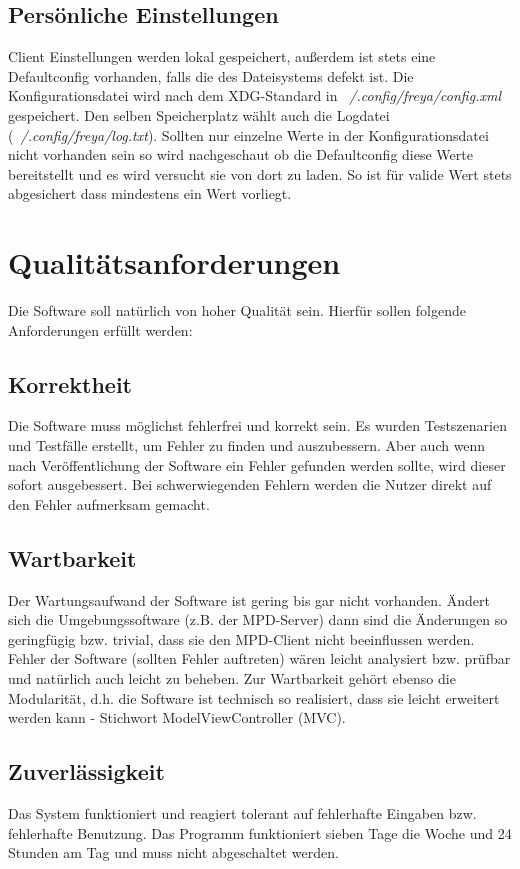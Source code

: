 \subsection{Persönliche Einstellungen}
Client Einstellungen werden lokal gespeichert, außerdem ist stets eine Defaultconfig vorhanden, falls die des Dateisystems defekt ist.
Die Konfigurationsdatei wird nach dem XDG-Standard in \emph{~/.config/freya/config.xml} gespeichert. Den selben Speicherplatz wählt auch die Logdatei 
(\emph{~/.config/freya/log.txt}). Sollten nur einzelne Werte in der Konfigurationsdatei nicht vorhanden sein so wird nachgeschaut ob die Defaultconfig
diese Werte bereitstellt und es wird versucht sie von dort zu laden. So ist für valide Wert stets abgesichert dass mindestens ein Wert vorliegt.
\section{Qualitätsanforderungen}
Die Software soll natürlich von hoher Qualität sein. Hierfür sollen folgende
Anforderungen erfüllt werden:
\subsection{Korrektheit}
Die Software muss möglichst fehlerfrei und korrekt sein. Es wurden Testszenarien und Testfälle erstellt,
um Fehler zu finden und auszubessern. Aber auch wenn nach Veröffentlichung der Software ein 
Fehler gefunden werden sollte, wird dieser sofort ausgebessert. Bei schwerwiegenden Fehlern
werden die Nutzer direkt auf den Fehler aufmerksam gemacht.
\subsection{Wartbarkeit}
Der Wartungsaufwand der Software ist gering bis gar nicht vorhanden. Ändert sich die Umgebungssoftware
(z.B. der MPD-Server) dann sind die Änderungen so geringfügig bzw. trivial, dass sie den MPD-Client 
nicht beeinflussen werden. Fehler der Software (sollten Fehler auftreten) wären leicht analysiert bzw.
prüfbar und natürlich auch leicht zu beheben. Zur Wartbarkeit gehört ebenso die Modularität, d.h.
die Software ist technisch so realisiert, dass sie leicht erweitert werden kann - Stichwort ModelViewController (MVC). 
\subsection{Zuverlässigkeit}
Das System funktioniert und reagiert tolerant auf fehlerhafte Eingaben bzw. fehlerhafte Benutzung.
Das Programm funktioniert sieben Tage die Woche und 24 Stunden am Tag und muss nicht abgeschaltet werden.

